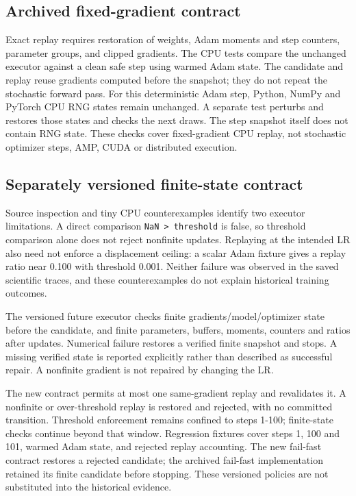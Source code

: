 \documentclass[11pt,a4paper]{article}
\begin{document}
\subsection{Archived fixed-gradient contract}\label{archived-fixed-gradient-contract}

Exact replay requires restoration of weights, Adam moments and step counters, parameter groups, and clipped gradients. The CPU tests compare the unchanged executor against a clean safe step using warmed Adam state. The candidate and replay reuse gradients computed before the snapshot; they do not repeat the stochastic forward pass. For this deterministic Adam step, Python, NumPy and PyTorch CPU RNG states remain unchanged. A separate test perturbs and restores those states and checks the next draws. The step snapshot itself does not contain RNG state. These checks cover fixed-gradient CPU replay, not stochastic optimizer steps, AMP, CUDA or distributed execution.

\subsection{Separately versioned finite-state contract}\label{separately-versioned-finite-state-contract}

Source inspection and tiny CPU counterexamples identify two executor limitations. A direct comparison \texttt{NaN\ \textgreater{}\ threshold} is false, so threshold comparison alone does not reject nonfinite updates. Replaying at the intended LR also need not enforce a displacement ceiling: a scalar Adam fixture gives a replay ratio near 0.100 with threshold 0.001. Neither failure was observed in the saved scientific traces, and these counterexamples do not explain historical training outcomes.

The versioned future executor checks finite gradients/model/optimizer state before the candidate, and finite parameters, buffers, moments, counters and ratios after updates. Numerical failure restores a verified finite snapshot and stops. A missing verified state is reported explicitly rather than described as successful repair. A nonfinite gradient is not repaired by changing the LR.

The new contract permits at most one same-gradient replay and revalidates it. A nonfinite or over-threshold replay is restored and rejected, with no committed transition. Threshold enforcement remains confined to steps 1-100; finite-state checks continue beyond that window. Regression fixtures cover steps 1, 100 and 101, warmed Adam state, and rejected replay accounting. The new fail-fast contract restores a rejected candidate; the archived fail-fast implementation retained its finite candidate before stopping. These versioned policies are not substituted into the historical evidence.
\end{document}
